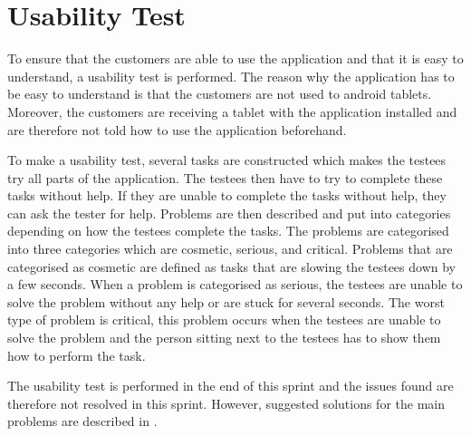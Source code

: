 \section{Usability Test}\label{sec:usability-test}
To ensure that the customers are able to use the application and that it is easy to understand, a usability test is performed.
The reason why the application has to be easy to understand is that the customers are not used to android tablets.
Moreover, the customers are receiving a tablet with the application installed and are therefore not told how to use the application beforehand.

To make a usability test, several tasks are constructed which makes the testees try all parts of the application. 
The testees then have to try to complete these tasks without help.
If they are unable to complete the tasks without help, they can ask the tester for help.
Problems are then described and put into categories depending on how the testees complete the tasks.
The problems are categorised into three categories which are cosmetic, serious, and critical.
Problems that are categorised as cosmetic are defined as tasks that are slowing the testees down by a few seconds.
When a problem is categorised as serious, the testees are unable to solve the problem without any help or are stuck for several seconds.
The worst type of problem is critical, this problem occurs when the testees are unable to solve the problem and the person sitting next to the testees has to show them how to perform the task.

The usability test is performed in the end of this sprint and the issues found are therefore not resolved in this sprint.
However, suggested solutions for the main problems are described in .

